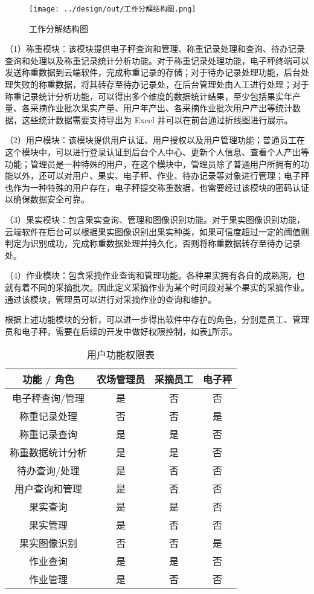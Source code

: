 \begin{figure}[H]
    \centering
    \texttt{[image: ../design/out/工作分解结构图.png]}
    \caption{工作分解结构图}
    \label{fig:工作分解结构图}
\end{figure}

（1）称重模块：该模块提供电子秤查询和管理、称重记录处理和查询、待办记录查询和处理以及称重记录统计分析功能。对于称重记录处理功能，电子秤终端可以发送称重数据到云端软件，完成称重记录的存储；对于待办记录处理功能，后台处理失败的称重数据，将其转存至待办记录处，在后台管理处由人工进行处理；对于称重记录统计分析功能，可以得出多个维度的数据统计结果，至少包括果实年产量、各采摘作业批次果实产量、用户年产出、各采摘作业批次用户产出等统计数据，这些统计数据需要支持导出为 Excel 并可以在前台通过折线图进行展示。

（2）用户模块：该模块提供用户认证、用户授权以及用户管理功能；普通员工在这个模块中，可以进行登录认证到后台个人中心、更新个人信息、查看个人产出等功能；管理员是一种特殊的用户，在这个模块中，管理员除了普通用户所拥有的功能以外，还可以对用户、果实、电子秤、作业、待办记录等对象进行管理；电子秤也作为一种特殊的用户存在，电子秤提交称重数据，也需要经过该模块的密码认证以确保数据安全可靠。

（3）果实模块：包含果实查询、管理和图像识别功能。对于果实图像识别功能，云端软件在后台可以根据果实图像识别出果实种类，如果可信度超过一定的阈值则判定为识别成功，完成称重数据处理并持久化，否则将称重数据转存至待办记录处。

（4）作业模块：包含采摘作业查询和管理功能。各种果实拥有各自的成熟期，也就有着不同的采摘批次。因此定义采摘作业为某个时间段对某个果实的采摘作业。通过该模块，管理员可以进行对采摘作业的查询和维护。

根据上述功能模块的分析，可以进一步得出软件中存在的角色，分别是员工、管理员和电子秤，需要在后续的开发中做好权限控制，如表\ref{tab:user_permissions}所示。

\begin{table}[ht]
\centering
\begin{tabular}{|c|c|c|c|}
\hline
 功能 / 角色              & 农场管理员 & 采摘员工 & 电子秤 \\ \hline
电子秤查询/管理  & 是 & 否 & 否 \\ \hline
称重记录处理        & 否 & 否 & 是 \\ \hline
称重记录查询        & 是 & 是 & 否 \\ \hline
称重数据统计分析        & 是 & 是 & 否 \\ \hline
待办查询/处理    & 是 & 否 & 否  \\ \hline
用户查询和管理 & 是 & 否 & 否 \\ \hline
果实查询 & 是 & 是 & 否 \\ \hline
果实管理 & 是 & 否 & 否 \\ \hline
果实图像识别 & 否 & 否 & 是 \\ \hline
作业查询 & 是 & 是 & 否 \\ \hline
作业管理 & 是 & 否 & 否 \\ \hline
\end{tabular}
\vspace{10pt}
\caption{用户功能权限表}
\label{tab:user_permissions}
\end{table}

